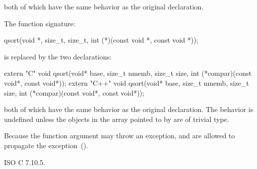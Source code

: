 both of which have the same behavior as the original declaration.

\pnum
The function signature:

\begin{codeblock}
qsort(void *, size_t, size_t,
  int (*)(const void *, const void *));
\end{codeblock}

is replaced by the two declarations:

\begin{codeblock}
extern "C" void qsort(void* base, size_t nmemb, size_t size,
                      int (*compar)(const void*, const void*));
extern "C++" void qsort(void* base, size_t nmemb, size_t size,
                        int (*compar)(const void*, const void*));
\end{codeblock}

both of which have the same behavior as the original declaration. The behavior is
undefined unless the objects in the array pointed to by  are of trivial type.

\enternote
Because the function argument  may throw an exception,
and
are allowed to propagate the exception~().
\exitnote

\xref
ISO C 7.10.5.
